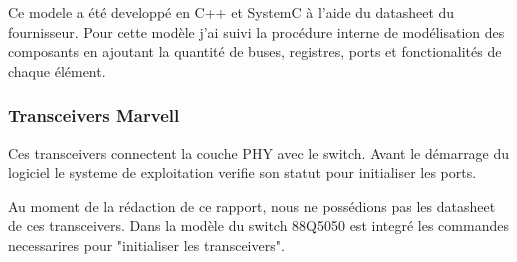 Ce modele a \'et\'e developp\'e en C++ et SystemC \`a l'aide du datasheet du fournisseur. Pour cette modèle j'ai suivi la procédure interne de modélisation des composants en ajoutant la quantit\'e  de buses, registres, ports et fonctionalit\'es de chaque élément. 

\subsubsection{Transceivers Marvell}

Ces transceivers\cite{88Q2112}\cite{88Q1010} connectent la couche PHY avec le switch. Avant le démarrage du logiciel le systeme de exploitation verifie son statut pour initialiser les ports.

Au moment de la rédaction de ce rapport, nous ne possédions pas les datasheet de ces transceivers. Dans la modèle du switch 88Q5050 est integr\'e les commandes necessarires pour "initialiser les transceivers".